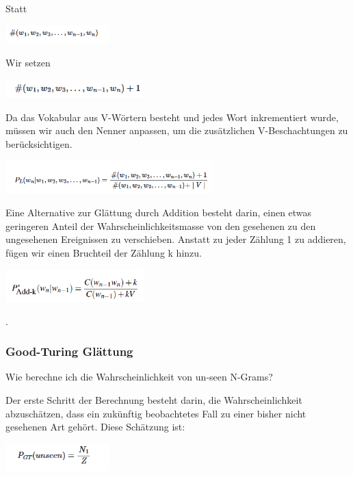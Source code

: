 \documentclass[12pt]{article}
\begin{document}
Statt
\begin{center}
	\includegraphics[width=0.3\textwidth]{statics/Borisov/1.PNG}
\end{center}

Wir setzen
\begin{center}
	\includegraphics[width=0.4\textwidth]{statics/Borisov/2.PNG}
\end{center}

Da das Vokabular aus V-Wörtern besteht und jedes Wort inkrementiert wurde, müssen wir auch den Nenner anpassen, um die zusätzlichen V-Beschachtungen zu berücksichtigen.
\begin{center}
	\includegraphics[width=0.6\textwidth]{statics/Borisov/3.PNG}
\end{center}

\cite{maucher2022}

Eine Alternative zur Glättung durch Addition besteht darin, einen etwas geringeren Anteil der Wahrscheinlichkeitsmasse von den gesehenen zu den ungesehenen Ereignissen zu verschieben. Anstatt zu jeder Zählung 1 zu addieren, fügen wir einen Bruchteil der Zählung k hinzu.
\begin{center}
	\includegraphics[width=0.4\textwidth]{statics/Borisov/4.PNG}
\end{center}

\cite{jurafsky2023}.

\subsubsection{Good-Turing Glättung}
Wie berechne ich die Wahrscheinlichkeit von un-seen N-Grams?

Der erste Schritt der Berechnung besteht darin, die Wahrscheinlichkeit abzuschätzen, dass ein zukünftig beobachtetes Fall zu einer bisher nicht gesehenen Art gehört. Diese Schätzung ist:
\begin{center}
	\includegraphics[width=0.3\textwidth]{statics/Borisov/5.PNG}
\end{center}
\end{document}
